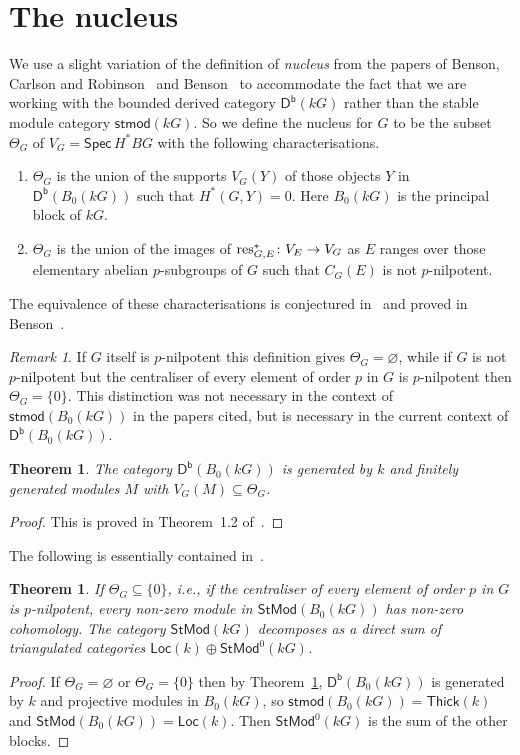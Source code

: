 \documentclass[12pt]{amsart}
\newcommand{\DD}{\mathsf{D}}%
\newcommand{\Db}{\DD^{\mathsf{b}}}%
\newcommand{\kG}{\kk G}
\newcommand{\kk}{k}
\newcommand{\Loc}{\mathsf{Loc}}
\newcommand{\res}{\mathop{\rm res}}
\newcommand{\Spec}{\mathsf{Spec}\,}
\newcommand{\stmod}{\mathsf{stmod}}
\newcommand{\StMod}{\mathsf{StMod}}
\newcommand{\Thick}{\mathsf{Thick}}
\numberwithin{equation}{section}
\theoremstyle{plain}
\newtheorem{theorem}[equation]{Theorem}
\theoremstyle{definition}
\theoremstyle{remark}
\newtheorem{remark}[equation]{Remark}
\begin{document}
\section{The nucleus}\label{se:nucleus}



We use a slight variation of the definition of \emph{nucleus} from the
papers of Benson, Carlson and Robinson~\cite{Benson/Carlson/Robinson:1990a} 
and Benson~\cite{Benson:1995a}
to accommodate the fact that we are working with the bounded derived
category $\Db(\kG)$ rather than the stable module category 
$\stmod(\kG)$. So we define the
nucleus for $G$ to be the subset $\Theta_G$ of $V_G=\Spec H^*BG$ with the
following characterisations.
\begin{enumerate}
\item $\Theta_G$ is the union of the supports $V_G(Y)$ of those
  objects $Y$ in $\Db(B_0(\kG))$ such that $H^*(G,Y)=0$. Here
  $B_0(\kG)$ is the principal block of $\kG$.
\item $\Theta_G$ is the union of the images of $\res^*_{G,E}\colon V_E
  \to V_G$ as $E$ ranges over those elementary abelian $p$-subgroups
of $G$  such that $C_G(E)$ is not $p$-nilpotent.
\end{enumerate}
The equivalence of these characterisations is conjectured
in~\cite{Benson/Carlson/Robinson:1990a} and proved in
Benson~\cite{Benson:1995a}. 

\begin{remark}
If $G$ itself is $p$-nilpotent this definition gives
$\Theta_G=\varnothing$, while if $G$ is not $p$-nilpotent but the
centraliser of every element of order $p$ in $G$ is $p$-nilpotent then $\Theta_G=\{0\}$.
This distinction was not necessary in the context of
$\stmod(B_0(\kG))$ in the papers cited,
but is necessary in the current context of $\Db(B_0(\kG))$.
\end{remark}

\begin{theorem}\label{th:nucleus}
The category $\Db(B_0(\kG))$ is generated by $\kk$ and 
finitely generated modules $M$ with $V_G(M)\subseteq \Theta_G$.
\end{theorem}
\begin{proof}
This is proved in Theorem~1.2 of~\cite{Benson:1995a}.
\end{proof}

The following is essentially contained in~\cite{Benson:1995a}.

\begin{theorem}\label{th:zero-nucleus}
If $\Theta_G\subseteq\{0\}$, i.e., if the
centraliser of every element of order $p$ in $G$ is $p$-nilpotent,
every non-zero module in $\StMod(B_0(\kG))$ has non-zero cohomology.
The category $\StMod(\kG)$
decomposes as a direct sum of triangulated categories 
$\Loc(\kk) \oplus \StMod^0(\kG)$.
\end{theorem}
\begin{proof}
If $\Theta_G=\varnothing$ or $\Theta_G=\{0\}$ then by
Theorem~\ref{th:nucleus}, $\Db(B_0(\kG))$ is generated by $\kk$ and
projective modules in $B_0(\kG)$, so $\stmod(B_0(\kG))=\Thick(\kk)$
and $\StMod(B_0(\kG))=\Loc(\kk)$.
Then $\StMod^0(\kG)$ is the sum of the other blocks.
\end{proof}
\end{document}
